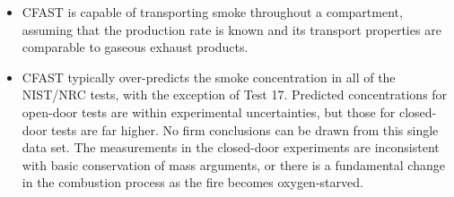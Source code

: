 \begin{itemize}
\item CFAST is capable of transporting smoke throughout a compartment, assuming that the production rate is known and its transport properties are comparable to gaseous exhaust products.
\item CFAST typically over-predicts the smoke concentration in all of the NIST/NRC tests, with the exception of Test 17.  Predicted concentrations for open-door tests are within experimental uncertainties, but those for closed-door tests are far higher.  No firm conclusions can be drawn from this single data set.  The measurements in the closed-door experiments are inconsistent with basic conservation of mass arguments, or there is a fundamental change in the combustion process as the fire becomes oxygen-starved.
\end{itemize}